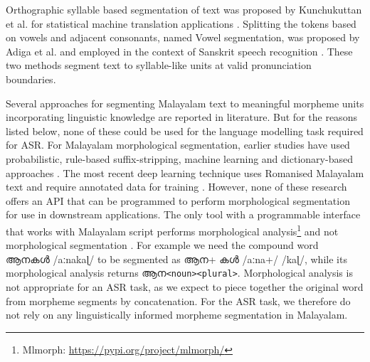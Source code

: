 Orthographic syllable based segmentation of text was proposed by Kunchukuttan
et al. for statistical machine translation applications
\cite{kunchukuttan2016}. Splitting the tokens based on vowels and adjacent
consonants, named Vowel segmentation, was proposed by Adiga et al. and employed
in the context of Sanskrit speech recognition \cite{adiga-etal-2021-automatic}.
These two methods segment text to syllable-like units at valid pronunciation
boundaries.






Several approaches for segmenting Malayalam text to meaningful morpheme units
incorporating linguistic knowledge are reported in literature. But for the
reasons listed below, none of these could be used for the language modelling
task required for ASR. For Malayalam morphological segmentation, earlier
studies have used probabilistic, rule-based suffix-stripping, machine learning
and dictionary-based approaches \cite{rajeev2007suffix, rinju2013morphological,
    antony2012computational,abeera2010morphological}. The most recent deep learning
technique uses Romanised Malayalam text and require annotated data for training
\cite{dlmorph-mal-2018}. However, none of these research offers an API that can
be programmed to perform morphological segmentation for use in downstream
applications. The only tool with a programmable interface that works with
Malayalam script performs morphological analysis\footnote{Mlmorph:
    \url{https://pypi.org/project/mlmorph/}} and not morphological segmentation
\cite{thottingal2019finite}. For example we need the compound word {\mal
        ആനകൾ} {\ipa /aːnakaɭ/} to be segmented as {\mal ആന+ കൾ} {\ipa /aːna+/ /kaɭ/},
while its morphological analysis returns {\mal ആന}\texttt{<noun><plural>}.
Morphological analysis is not appropriate for an ASR task, as we expect to
piece together the original word from morpheme segments by concatenation. For
the ASR task, we therefore do not rely on any linguistically informed morpheme
segmentation in Malayalam.

